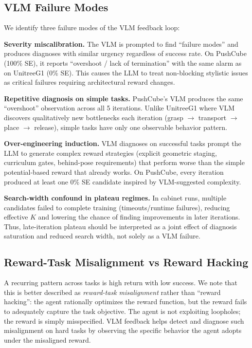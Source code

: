 \documentclass[conference]{IEEEtran}
\begin{document}
\subsection{VLM Failure Modes}

We identify three failure modes of the VLM feedback loop:

\textbf{Severity miscalibration.} The VLM is prompted to find ``failure modes''
and produces diagnoses with similar urgency regardless of success rate. On
PushCube (100\% SE), it reports ``overshoot / lack of termination'' with the
same alarm as on UnitreeG1 (0\% SE). This causes the LLM to treat non-blocking
stylistic issues as critical failures requiring architectural reward changes.

\textbf{Repetitive diagnosis on simple tasks.} PushCube's VLM produces the same
``overshoot'' observation across all 5 iterations. Unlike UnitreeG1 where VLM
discovers qualitatively new bottlenecks each iteration (grasp $\to$ transport
$\to$ place $\to$ release), simple tasks have only one observable behavior
pattern.

\textbf{Over-engineering induction.} VLM diagnoses on successful tasks prompt
the LLM to generate complex reward strategies (explicit geometric staging,
curriculum gates, behind-pose requirements) that perform worse than the simple
potential-based reward that already works. On PushCube, every iteration produced
at least one 0\% SE candidate inspired by VLM-suggested complexity.

\textbf{Search-width confound in plateau regimes.} In cabinet runs, multiple
candidates failed to complete training (timeouts/runtime failures), reducing
effective $K$ and lowering the chance of finding improvements in later
iterations. Thus, late-iteration plateau should be interpreted as a joint effect
of diagnosis saturation and reduced search width, not solely as a VLM failure.

\subsection{Reward-Task Misalignment vs Reward Hacking}

A recurring pattern across tasks is high return with low success. We note that
this is better described as \emph{reward-task misalignment} rather than
``reward hacking'': the agent rationally optimizes the reward function, but the
reward fails to adequately capture the task objective. The agent is not
exploiting loopholes; the reward is simply misspecified. VLM feedback helps
detect and diagnose such misalignment on hard tasks by observing the specific
behavior the agent adopts under the misaligned reward.
\end{document}
